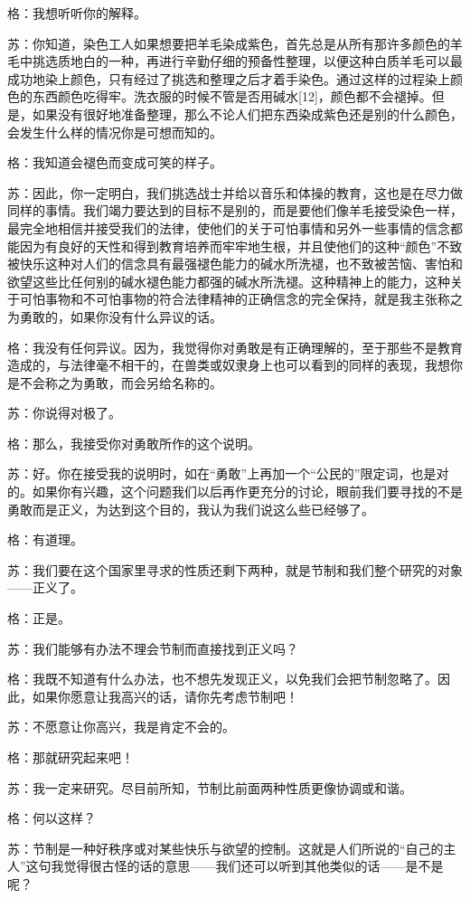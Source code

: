 \documentclass[12pt,oneside]{book}
\begin{document}
格：我想听听你的解释。

苏：你知道，染色工人如果想要把羊毛染成紫色，首先总是从所有那许多颜色的羊毛中挑选质地白的一种，再进行辛勤仔细的预备性整理，以便这种白质羊毛可以最成功地染上颜色，只有经过了挑选和整理之后才着手染色。通过这样的过程染上颜色的东西颜色吃得牢。洗衣服的时候不管是否用碱水[12]，颜色都不会褪掉。但是，如果没有很好地准备整理，那么不论人们把东西染成紫色还是别的什么颜色，会发生什么样的情况你是可想而知的。

格：我知道会褪色而变成可笑的样子。

苏：因此，你一定明白，我们挑选战士并给以音乐和体操的教育，这也是在尽力做同样的事情。我们竭力要达到的目标不是别的，而是要他们像羊毛接受染色一样，最完全地相信并接受我们的法律，使他们的关于可怕事情和另外一些事情的信念都能因为有良好的天性和得到教育培养而牢牢地生根，并且使他们的这种“颜色”不致被快乐这种对人们的信念具有最强褪色能力的碱水所洗褪，也不致被苦恼、害怕和欲望这些比任何别的碱水褪色能力都强的碱水所洗褪。这种精神上的能力，这种关于可怕事物和不可怕事物的符合法律精神的正确信念的完全保持，就是我主张称之为勇敢的，如果你没有什么异议的话。

格：我没有任何异议。因为，我觉得你对勇敢是有正确理解的，至于那些不是教育造成的，与法律毫不相干的，在兽类或奴隶身上也可以看到的同样的表现，我想你是不会称之为勇敢，而会另给名称的。

苏：你说得对极了。

格：那么，我接受你对勇敢所作的这个说明。

苏：好。你在接受我的说明时，如在“勇敢”上再加一个“公民的”限定词，也是对的。如果你有兴趣，这个问题我们以后再作更充分的讨论，眼前我们要寻找的不是勇敢而是正义，为达到这个目的，我认为我们说这么些已经够了。

格：有道理。

苏：我们要在这个国家里寻求的性质还剩下两种，就是节制和我们整个研究的对象——正义了。

格：正是。

苏：我们能够有办法不理会节制而直接找到正义吗？

格：我既不知道有什么办法，也不想先发现正义，以免我们会把节制忽略了。因此，如果你愿意让我高兴的话，请你先考虑节制吧！

苏：不愿意让你高兴，我是肯定不会的。

格：那就研究起来吧！

苏：我一定来研究。尽目前所知，节制比前面两种性质更像协调或和谐。

格：何以这样？

苏：节制是一种好秩序或对某些快乐与欲望的控制。这就是人们所说的“自己的主人”这句我觉得很古怪的话的意思——我们还可以听到其他类似的话——是不是呢？
\end{document}
